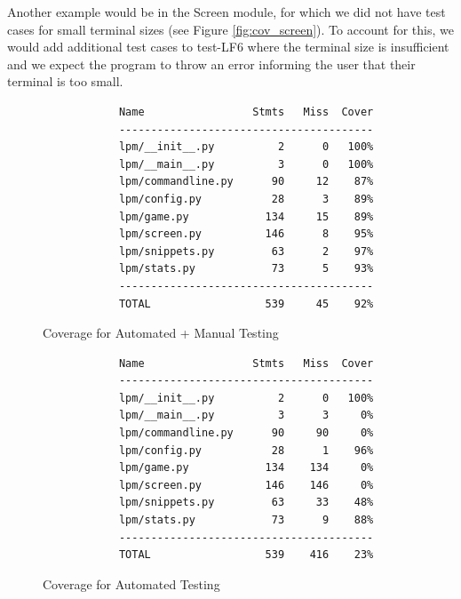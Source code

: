 \documentclass[12pt, titlepage]{article}
\begin{document}
Another example would be in the Screen module, for which we did not have test cases for small terminal sizes (see Figure \ref{fig:cov_screen}). To account for this, we would add additional test cases to test-LF6 where the terminal size is insufficient and we expect the program to throw an error informing the user that their terminal is too small.

\begin{figure}[H]
\centering
    \begin{lstlisting}
            Name                 Stmts   Miss  Cover
            ----------------------------------------
            lpm/__init__.py          2      0   100%
            lpm/__main__.py          3      0   100%
            lpm/commandline.py      90     12    87%
            lpm/config.py           28      3    89%
            lpm/game.py            134     15    89%
            lpm/screen.py          146      8    95%
            lpm/snippets.py         63      2    97%
            lpm/stats.py            73      5    93%
            ----------------------------------------
            TOTAL                  539     45    92%
    \end{lstlisting}
    \caption{Coverage for Automated + Manual Testing}
    \label{fig:coverage}
\end{figure}

\begin{figure}[H]
\centering
    \begin{lstlisting}
            Name                 Stmts   Miss  Cover
            ----------------------------------------
            lpm/__init__.py          2      0   100%
            lpm/__main__.py          3      3     0%
            lpm/commandline.py      90     90     0%
            lpm/config.py           28      1    96%
            lpm/game.py            134    134     0%
            lpm/screen.py          146    146     0%
            lpm/snippets.py         63     33    48%
            lpm/stats.py            73      9    88%
            ----------------------------------------
            TOTAL                  539    416    23%
    \end{lstlisting}
    \caption{Coverage for Automated Testing}
    \label{fig:cov_auto}
\end{figure}
\end{document}
